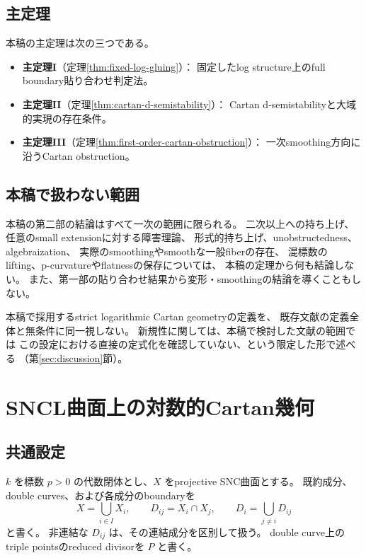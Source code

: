 \documentclass[uplatex,dvipdfmx,11pt]{jsarticle}
\numberwithin{equation}{section}
\theoremstyle{plain}
\theoremstyle{definition}
\theoremstyle{remark}
\begin{document}
\subsection*{主定理}

本稿の主定理は次の三つである。

\begin{itemize}
\item \textbf{主定理I}（定理\ref{thm:fixed-log-gluing}）：
固定したlog structure上のfull boundary貼り合わせ判定法。
\item \textbf{主定理II}（定理\ref{thm:cartan-d-semistability}）：
Cartan d-semistabilityと大域的実現の存在条件。
\item \textbf{主定理III}（定理\ref{thm:first-order-cartan-obstruction}）：
一次smoothing方向に沿うCartan obstruction。
\end{itemize}

\subsection*{本稿で扱わない範囲}

本稿の第二部の結論はすべて一次の範囲に限られる。
二次以上への持ち上げ、任意のsmall extensionに対する障害理論、
形式的持ち上げ、unobstructedness、algebraization、
実際のsmoothingやsmoothな一般fiberの存在、
混標数のlifting、p-curvatureやflatnessの保存については、
本稿の定理から何も結論しない。
また、第一部の貼り合わせ結果から変形・smoothingの結論を導くこともしない。

本稿で採用するstrict logarithmic Cartan geometryの定義を、
既存文献の定義全体と無条件に同一視しない。
新規性に関しては、本稿で検討した文献の範囲では
この設定における直接の定式化を確認していない、という限定した形で述べる
（第\ref{sec:discussion}節）。

\section{SNCL曲面上の対数的Cartan幾何}
\label{sec:definitions}

\subsection{共通設定}

\(k\) を標数 \(p>0\) の代数閉体とし、\(X\) をprojective SNC曲面とする。
既約成分、double curves、および各成分のboundaryを
\[
X=\bigcup_{i\in I}X_i,\qquad
D_{ij}=X_i\cap X_j,\qquad
D_i=\bigcup_{j\ne i}D_{ij}
\]
と書く。
非連結な \(D_{ij}\) は、その連結成分を区別して扱う。
double curve上のtriple pointsのreduced divisorを \(P\) と書く。
\end{document}
